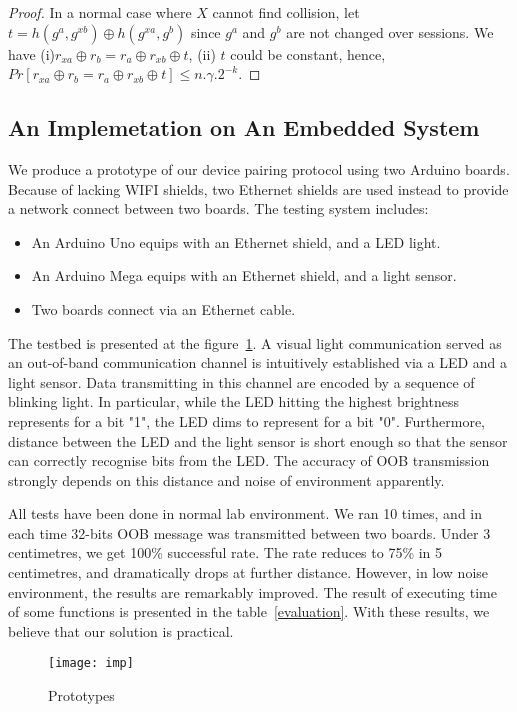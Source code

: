 \begin{proof}
In a normal case where $X$ cannot find collision, let $t= h(g^a,g^{xb}) \oplus h(g^{xa},g^b)$ since $g^a$ and $g^b$ are not changed over sessions. We have (i)$r_{xa} \oplus r_b = r_a \oplus r_{xb} \oplus t $, (ii) $t$ could be constant, hence, $Pr[r_{xa} \oplus r_b = r_a \oplus r_{xb} \oplus t ] \leq n.\gamma.2^{-k}$. 
\end{proof}

\subsection{An Implemetation on An Embedded System} 

We produce a prototype of our device pairing protocol using two Arduino boards. Because of lacking WIFI shields, two Ethernet shields are used instead to provide a network connect between two boards. The testing system includes:
\begin{itemize}
\item An Arduino Uno equips with an Ethernet shield, and a LED light.
\item An Arduino Mega equips with an Ethernet shield, and a light sensor.
\item Two boards connect via an Ethernet cable. 
\end{itemize}

The testbed is presented at the figure~\ref{imp}. A visual light communication served as an out-of-band communication channel is intuitively established via a LED and a light sensor. Data transmitting in this channel are encoded by a sequence of blinking light. In particular, while the LED hitting the highest brightness represents for a bit "1", the LED dims to represent for a bit "0". Furthermore, distance between the LED and the light sensor is short enough so that the sensor can correctly recognise bits from the LED. The accuracy of OOB transmission strongly depends on this distance and noise of environment apparently. 

All tests have been done in normal lab environment. We ran 10 times, and in each time 32-bits OOB message was transmitted between two boards. Under 3 centimetres, we get 100\% successful rate. The rate reduces to 75\% in 5 centimetres, and dramatically drops at further distance. However, in low noise environment, the results are remarkably improved. The result of executing time of some functions is presented in the table~\ref{evaluation}. With these results, we believe that our solution is practical.

\begin{figure}
  \centering
  \texttt{[image: imp]}
  \caption{Prototypes}
  \label{imp}
\end{figure}

